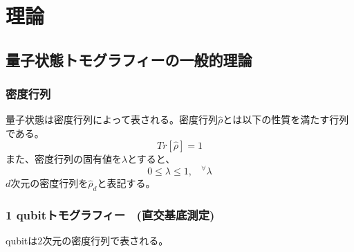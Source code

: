 \documentclass[11pt,a4j,notitlepage]{jreport}
\begin{document}
	\chapter{理論}
	\section{量子状態トモグラフィーの一般的理論}


	\subsection{密度行列}

	量子状態は密度行列によって表される。密度行列$\hat{\rho}$とは以下の性質を満たす行列である。
	\begin{equation}
		Tr[\hat{\rho}]=1
		\label{eq2.1}
	\end{equation}
	また、密度行列の固有値を$\lambda$とすると、
	\begin{equation}
		0 \leq \lambda \leq 1, \ \ \ \  ^\forall \lambda
		\label{eq2.2}
	\end{equation}
	$d$次元の密度行列を$\hat{\rho}_d$と表記する。



	\subsection{1 qubitトモグラフィー　(直交基底測定)}

	qubitは$2$次元の密度行列で表される。
\end{document}
